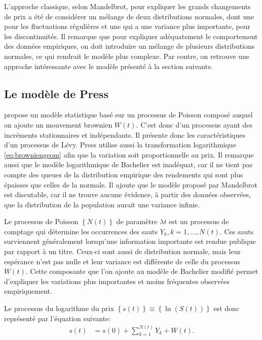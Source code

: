 L'approche classique, selon Mandelbrot, pour expliquer les grands
changements de prix a été de considérer un mélange de deux
distributions normales, dont une pour les fluctuations régulières et
une qui a une variance plus importante, pour les discontinuités. Il
remarque que pour expliquer adéquatement le comportement des données
empiriques, on doit introduire un mélange de plusieurs distributions
normales, ce qui rendrait le modèle plus complexe. Par contre, on
retrouve une approche intéressante avec le modèle présenté à la
section suivante.

\subsection{Le modèle de Press}
\label{sec:press}

\cite{press1967compound} propose un modèle statistique basé sur un
processus de Poisson composé auquel on ajoute un mouvement brownien
$W(t)$. C'est donc d'un processus ayant des incréments stationnaires
et indépendants. Il présente donc les caractéristiques d'un processus
de Lévy. Press utilise aussi la transformation logarithmique
\eqref{eq:browniengeom} afin que la variation soit proportionnelle au
prix. Il remarque aussi que le modèle logarithmique de Bachelier est
inadéquat, car il ne tient pas compte des queues de la distribution
empirique des rendements qui sont plus épaisses que celles de la
normale. Il ajoute que le modèle proposé par Mandelbrot est
discutable, car il ne trouve aucune évidence, à partir des données
observées, que la distribution de la population aurait une variance
infinie.

Le processus de Poisson $\left\{N(t)\right\}$ de paramètre $\lambda t$
est un processus de comptage qui détermine les occurrences des sauts
$Y_k, k = 1, \ldots, N(t)$. Ces sauts surviennent généralement
lorsqu'une information importante est rendue publique par rapport à un
titre. Ceux-ci sont aussi de distribution normale, mais leur espérance
n'est pas nulle et leur variance est différente de celle du processus
$W(t)$. Cette composante que l'on ajoute au modèle de Bachelier
modifié permet d'expliquer les variations plus importantes et moins
fréquentes observées empiriquement.

Le processus du logarithme du prix $\left\{s(t)\right\} \equiv
\left\{\ln{(S(t))}\right\}$ est donc représenté par l'équation
suivante:
\begin{align}
  \label{eq:press67}
  s(t) &= s(0) + \sum_{k=1}^{N(t)} Y_k + W(t).
\end{align}

